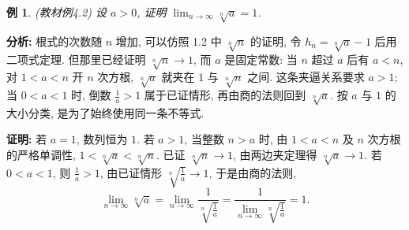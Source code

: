 \documentclass[UTF8,openany]{ctexbook}
\theoremstyle{chinesetextbook}
\newtheorem{example}{例}[section]
\newenvironment{cnproof}{\par\indent\textbf{证明:} \ignorespaces}{\par}
\begin{document}
\begin{example}
\textnormal{(教材例4.2)} 设 $a>0$, 证明 $\displaystyle \lim_{n\to\infty}\sqrt[n]{a}=1$.
\end{example}
\par\indent\textbf{分析:} 根式的次数随 $n$ 增加, 可以仿照 1.2 中 $\sqrt[n]n$ 的证明, 令 $h_n=\sqrt[n]a-1$ 后用二项式定理. 但那里已经证明 $\sqrt[n]n\to1$, 而 $a$ 是固定常数: 当 $n$ 超过 $a$ 后有 $a<n$, 对 $1<a<n$ 开 $n$ 次方根, $\sqrt[n]a$ 就夹在 $1$ 与 $\sqrt[n]n$ 之间. 这条夹逼关系要求 $a>1$; 当 $0<a<1$ 时, 倒数 $\displaystyle\frac1a>1$ 属于已证情形, 再由商的法则回到 $\sqrt[n]a$. 按 $a$ 与 $1$ 的大小分类, 是为了始终使用同一条不等式.
\begin{cnproof}
若 $a=1$, 数列恒为 $1$. 若 $a>1$, 当整数 $n>a$ 时, 由 $1<a<n$ 及 $n$ 次方根的严格单调性, $1<\sqrt[n]a<\sqrt[n]n$. 已证 $\sqrt[n]n\to1$, 由两边夹定理得 $\sqrt[n]a\to1$. 若 $0<a<1$, 则 $\displaystyle\frac1a>1$, 由已证情形 $\displaystyle\sqrt[n]{\frac1a}\to1$, 于是由商的法则,
\[
\lim_{n\to\infty}\sqrt[n]a
=\lim_{n\to\infty}\frac1{\sqrt[n]{\frac1a}}
=\frac1{\displaystyle\lim_{n\to\infty}\sqrt[n]{\frac1a}}=1.
\]
\end{cnproof}
\end{document}
